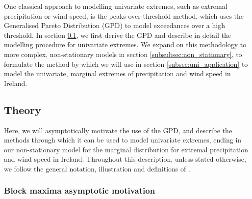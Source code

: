 \documentclass{article}
\numberwithin{equation}{section}
\begin{document}
One classical approach to modelling univariate extremes, such as extremal precipitation or wind speed, is the peaks-over-threshold method, which uses the Generalised Pareto Distribution (GPD) to model exceedances over a high threshold.
In section \ref{subsec:uni_theory}, we first derive the GPD and describe in detail the modelling procedure for univariate extremes.
We expand on this methodology to more complex, non-stationary models in section \ref{subsubsec:non_stationary}, to formulate the method by which we will use in section \ref{subsec:uni_application} to model the univariate, marginal extremes of precipitation and wind speed in Ireland.

\subsection{Theory} \label{subsec:uni_theory}

Here, we will asymptotically motivate the use of the GPD, and describe the methods through which it can be used to model univariate extremes, ending in our non-stationary model for the marginal distribution for extremal precipitation and wind speed in Ireland.
Throughout this description, unless stated otherwise, we follow the general notation, illustration and definitions of \cite{Coles2001}.

\subsubsection{Block maxima asymptotic motivation} \label{subsubsec:asymptotic}

\end{document}
